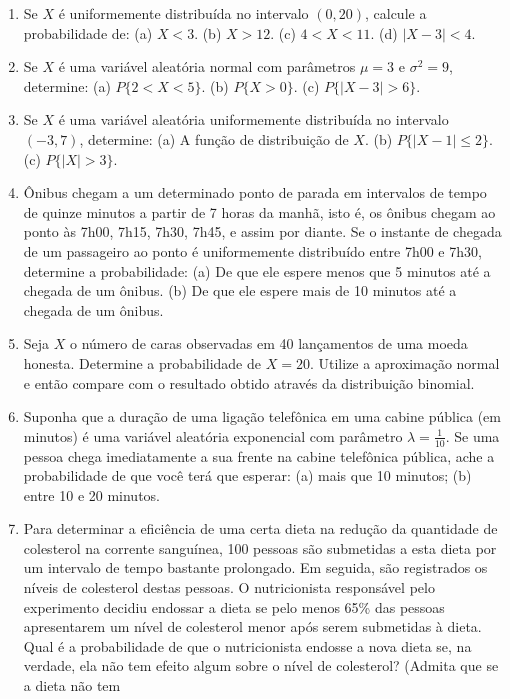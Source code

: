 \documentclass[
  10pt,
]{article}
\begin{document}
\begin{enumerate}
\def\labelenumi{\arabic{enumi}.}
\item
  Se \(X\) é uniformemente distribuída no intervalo \((0, 20)\), calcule
  a probabilidade de: (a) \(X < 3\). (b) \(X > 12\). (c) \(4 < X < 11\).
  (d) \(|X - 3| < 4\).
\item
  Se \(X\) é uma variável aleatória normal com parâmetros \(\mu = 3\) e
  \(\sigma^2 = 9\), determine: (a) \(P\{2 < X < 5\}\). (b)
  \(P\{X > 0\}\). (c) \(P\{|X - 3| > 6\}\).
\item
  Se \(X\) é uma variável aleatória uniformemente distribuída no
  intervalo \((-3, 7)\), determine: (a) A função de distribuição de
  \(X\). (b) \(P\{|X - 1| \leq 2\}\). (c) \(P\{|X| > 3\}\).
\item
  Ônibus chegam a um determinado ponto de parada em intervalos de tempo
  de quinze minutos a partir de 7 horas da manhã, isto é, os ônibus
  chegam ao ponto às 7h00, 7h15, 7h30, 7h45, e assim por diante. Se o
  instante de chegada de um passageiro ao ponto é uniformemente
  distribuído entre 7h00 e 7h30, determine a probabilidade: (a) De que
  ele espere menos que 5 minutos até a chegada de um ônibus. (b) De que
  ele espere mais de 10 minutos até a chegada de um ônibus.
\item
  Seja \(X\) o número de caras observadas em 40 lançamentos de uma moeda
  honesta. Determine a probabilidade de \(X = 20\). Utilize a
  aproximação normal e então compare com o resultado obtido através da
  distribuição binomial.
\item
  Suponha que a duração de uma ligação telefônica em uma cabine pública
  (em minutos) é uma variável aleatória exponencial com parâmetro
  \(\lambda = \frac{1}{10}\). Se uma pessoa chega imediatamente a sua
  frente na cabine telefônica pública, ache a probabilidade de que você
  terá que esperar: (a) mais que 10 minutos; (b) entre 10 e 20 minutos.
\item
  Para determinar a eficiência de uma certa dieta na redução da
  quantidade de colesterol na corrente sanguínea, 100 pessoas são
  submetidas a esta dieta por um intervalo de tempo bastante prolongado.
  Em seguida, são registrados os níveis de colesterol destas pessoas. O
  nutricionista responsável pelo experimento decidiu endossar a dieta se
  pelo menos 65\% das pessoas apresentarem um nível de colesterol menor
  após serem submetidas à dieta. Qual é a probabilidade de que o
  nutricionista endosse a nova dieta se, na verdade, ela não tem efeito
  algum sobre o nível de colesterol? (Admita que se a dieta não tem

\end{enumerate}
\end{document}
